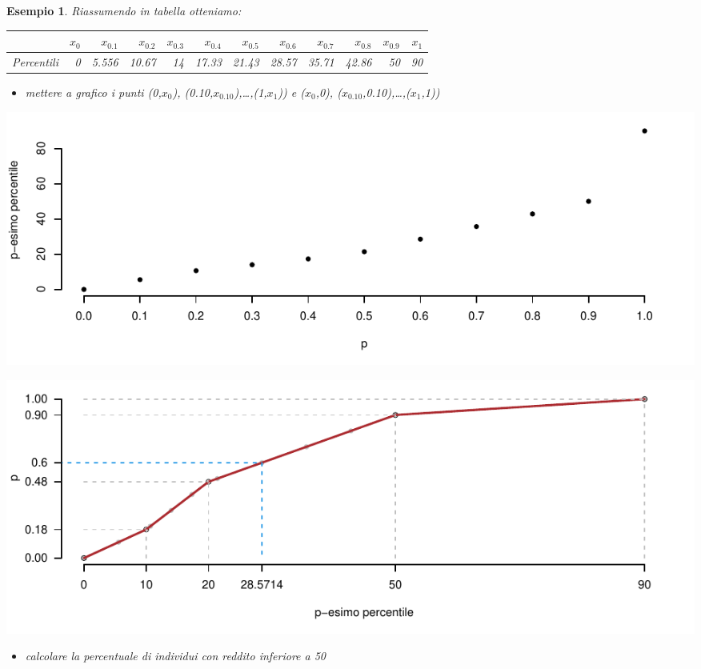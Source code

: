 \documentclass[
  11pt,
]{book}
\providecommand{\tightlist}{%
  \setlength{\itemsep}{0pt}\setlength{\parskip}{0pt}}
\theoremstyle{mytheoremstyle}
\theoremstyle{mydefstyle}
\newtheorem{example}{{Esempio}}[section]
\begin{document}
\begin{example}
Riassumendo in tabella otteniamo:

\begin{tabular}{lrrrrrrrrrrr}
\toprule
  & $x_{ 0 }$ & $x_{ 0.1 }$ & $x_{ 0.2 }$ & $x_{ 0.3 }$ & $x_{ 0.4 }$ & $x_{ 0.5 }$ & $x_{ 0.6 }$ & $x_{ 0.7 }$ & $x_{ 0.8 }$ & $x_{ 0.9 }$ & $x_{ 1 }$\\
\midrule
Percentili & 0 & 5.556 & 10.67 & 14 & 17.33 & 21.43 & 28.57 & 35.71 & 42.86 & 50 & 90\\
\bottomrule
\end{tabular}

\begin{itemize}
\tightlist
\item
  mettere a grafico i punti (0,\(x_0\)), (0.10,\(x_{0.10}\)),\ldots,(1,\(x_{1}\))) e (\(x_0\),0), (\(x_{0.10}\),0.10),\ldots,(\(x_{1}\),1))
\end{itemize}

\begin{center}\includegraphics{Appunti_di_Statistica_2025_files/figure-latex/decili-g1-1} \end{center}

\begin{center}\includegraphics{Appunti_di_Statistica_2025_files/figure-latex/decili-g10-1} \end{center}

\begin{itemize}
\tightlist
\item
  calcolare la percentuale di individui con reddito inferiore a 50
\end{itemize}


\end{example}
\end{document}
